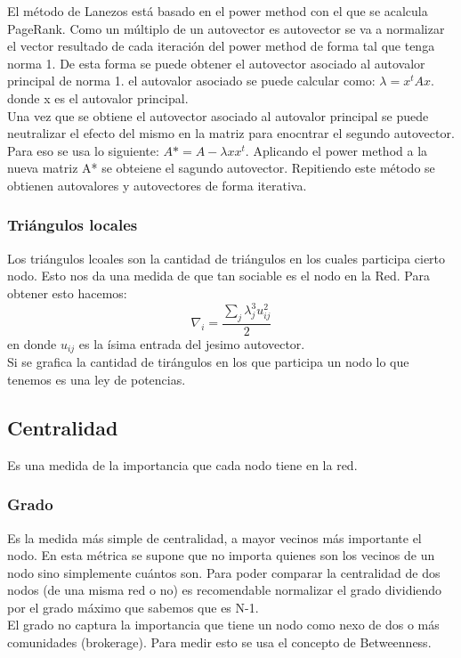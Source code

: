 \documentclass[titlepage,a4paper]{article}
\begin{document}
El método de Lanezos está basado en el power method con el que se acalcula PageRank. Como un múltiplo de un autovector es autovector se va a normalizar el vector resultado de cada iteración del power method de forma tal que tenga norma 1. De esta forma se puede obtener el autovector asociado al autovalor principal de norma 1. el autovalor asociado se puede calcular como: $\lambda = x^tAx$. donde x es el autovalor principal. \\

Una vez que se obtiene el autovector asociado al autovalor principal se puede neutralizar el efecto del mismo en la matriz para enocntrar el segundo autovector. Para eso se usa lo siguiente: $A* = A -\lambda x x^t$. Aplicando el power method a la nueva matriz A* se obteiene el sagundo autovector. Repitiendo este método se obtienen autovalores y autovectores de forma iterativa. 

\subsubsection*{Triángulos locales} 
Los triángulos lcoales son la cantidad de triángulos en los cuales participa cierto nodo. Esto nos da una medida de que tan sociable es el nodo en la Red. Para obtener esto hacemos: $$\nabla_ i = \frac{\sum_j \lambda_j^3 u_{ij}^2}{2}$$ en donde $u_{ij}$ es la ísima entrada del jesimo autovector. \\

Si se grafica la cantidad de tirángulos en los que participa un nodo lo que tenemos es una ley de potencias. 

\subsection*{Centralidad}
Es una medida de la importancia que cada nodo tiene en la red. 

\subsubsection*{Grado}
Es la medida más simple de centralidad, a mayor vecinos más importante el nodo. En esta métrica se supone que no importa quienes son los vecinos de un nodo sino simplemente cuántos son. Para poder comparar la centralidad de dos nodos (de una misma red o no) es recomendable normalizar el grado dividiendo por el grado máximo que sabemos que es N-1. \\

El grado no captura la importancia que tiene un nodo como nexo de dos o más comunidades (brokerage). Para medir esto se usa el concepto de Betweenness. 
\end{document}
